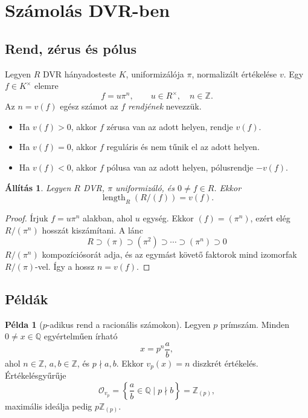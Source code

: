 \documentclass[11pt,a4paper]{article}
\newtheorem{allitas}[tetel]{Állítás}
\theoremstyle{definition}
\newtheorem{pelda}[tetel]{Példa}
\DeclareMathOperator{\length}{length}
\newcommand{\OO}{\mathcal O}
\newcommand{\ZZ}{\mathbb Z}
\begin{document}
\section{Számolás DVR-ben}

\subsection{Rend, zérus és pólus}

Legyen $R$ DVR hányadosteste $K$, uniformizálója $\pi$, normalizált
értékelése $v$. Egy $f\in K^\times$ elemre
\[
  f=u\pi^n,\qquad u\in R^\times,\quad n\in\ZZ.
\]
Az $n=v(f)$ egész számot az $f$ \emph{rendjének} nevezzük.

\begin{itemize}
  \item Ha $v(f)>0$, akkor $f$ zérusa van az adott helyen, rendje
        $v(f)$.
  \item Ha $v(f)=0$, akkor $f$ reguláris és nem tűnik el az adott
        helyen.
  \item Ha $v(f)<0$, akkor $f$ pólusa van az adott helyen, pólusrendje
        $-v(f)$.
\end{itemize}

\begin{allitas}
Legyen $R$ DVR, $\pi$ uniformizáló, és $0\neq f\in R$. Ekkor
\[
  \length_R(R/(f))=v(f).
\]
\end{allitas}

\begin{proof}
Írjuk $f=u\pi^n$ alakban, ahol $u$ egység. Ekkor
$(f)=(\pi^n)$, ezért elég $R/(\pi^n)$ hosszát kiszámítani. A lánc
\[
  R\supset(\pi)\supset(\pi^2)\supset\cdots\supset(\pi^n)\supset 0
\]
$R/(\pi^n)$ kompozíciósorát adja, és az egymást követő faktorok
mind izomorfak $R/(\pi)$-vel. Így a hossz $n=v(f)$.
\end{proof}

\subsection{Példák}

\begin{pelda}[$p$-adikus rend a racionális számokon]
Legyen $p$ prímszám. Minden $0\neq x\in\mathbb Q$ egyértelműen írható
\[
  x=p^n\frac{a}{b},
\]
ahol $n\in\ZZ$, $a,b\in\ZZ$, és $p\nmid a,b$. Ekkor
$v_p(x)=n$ diszkrét értékelés. Értékelésgyűrűje
\[
  \OO_{v_p}=\left\{\frac{a}{b}\in\mathbb Q\mid p\nmid b\right\}
  =\ZZ_{(p)},
\]
maximális ideálja pedig $p\ZZ_{(p)}$.
\end{pelda}
\end{document}
